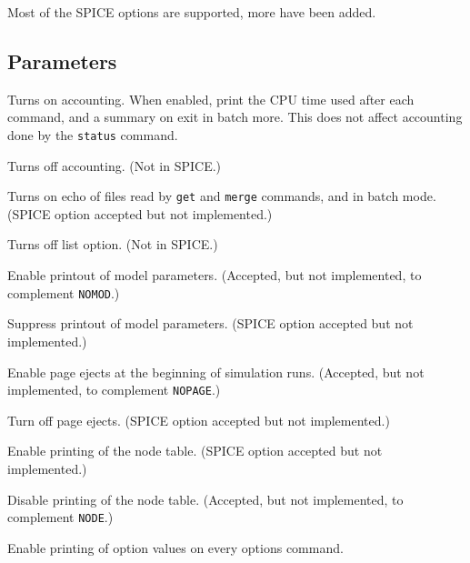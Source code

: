 Most of the SPICE options are supported, more have been added.
\subsection{Parameters}

\begin{description}

\item[{\tt ACCT}] Turns on accounting.  When enabled, print the
CPU time used after each command, and a summary on exit in batch
more.  This does not affect accounting done by the {\tt status}
command.

\item[{\tt NOACCT}] Turns off accounting.  (Not in SPICE.)

\item[{\tt LIST}] Turns on echo of files read by {\tt get} and
{\tt merge} commands, and in batch mode.  (SPICE option accepted
but not implemented.)

\item[{\tt NOLIST}] Turns off list option.  (Not in SPICE.)

\item[{\tt MOD}] Enable printout of model parameters.  (Accepted,
but not implemented, to complement {\tt NOMOD}.)

\item[{\tt NOMOD}] Suppress printout of model parameters.  (SPICE
option accepted but not implemented.)

\item[{\tt PAGE}] Enable page ejects at the beginning of
simulation runs.  (Accepted, but not implemented, to complement
{\tt NOPAGE}.)

\item[{\tt NOPAGE}] Turn off page ejects.  (SPICE option accepted
but not implemented.)

\item[{\tt NODE}] Enable printing of the node table.  (SPICE
option accepted but not implemented.)

\item[{\tt NONODE}] Disable printing of the node table.
(Accepted, but not implemented, to complement {\tt NODE}.)

\item[{\tt OPTS}] Enable printing of option values on every options
command.


\end{description}
